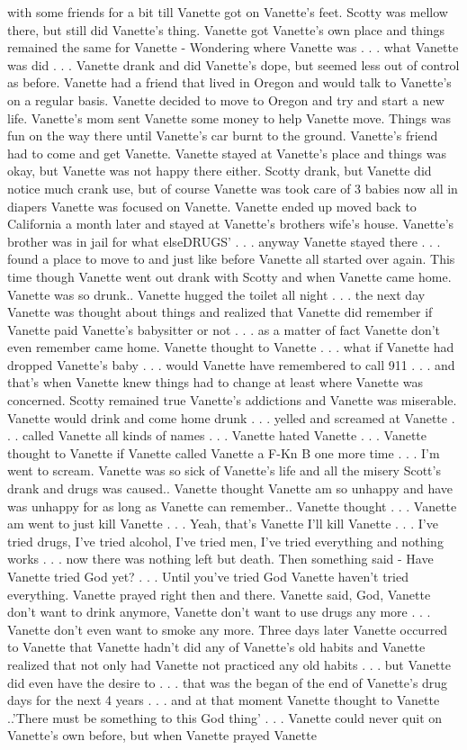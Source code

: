 \documentclass[12pt]{book}
\begin{document}
with some friends for a bit till Vanette got on Vanette's feet. Scotty was mellow there, but still did Vanette's thing. Vanette got Vanette's own place and things remained the same for Vanette - Wondering where Vanette was  . . .  what Vanette was did  . . .  Vanette drank and did Vanette's dope, but seemed less out of control as before. Vanette had a friend that lived in Oregon and would talk to Vanette's on a regular basis. Vanette decided to move to Oregon and try and start a new life. Vanette's mom sent Vanette some money to help Vanette move. Things was fun on the way there until Vanette's car burnt to the ground. Vanette's friend had to come and get Vanette. Vanette stayed at Vanette's place and things was okay, but Vanette was not happy there either. Scotty drank, but Vanette did notice much crank use, but of course Vanette was took care of 3 babies now all in diapers Vanette was focused on Vanette. Vanette ended up moved back to California a month later and stayed at Vanette's brothers wife's house. Vanette's brother was in jail for what elseDRUGS'  . . .  anyway Vanette stayed there  . . .  found a place to move to and just like before Vanette all started over again. This time though Vanette went out drank with Scotty and when Vanette came home. Vanette was so drunk.. Vanette hugged the toilet all night  . . .  the next day Vanette was thought about things and realized that Vanette did remember if Vanette paid Vanette's babysitter or not  . . .  as a matter of fact Vanette don't even remember came home. Vanette thought to Vanette  . . .  what if Vanette had dropped Vanette's baby  . . .  would Vanette have remembered to call 911  . . .  and that's when Vanette knew things had to change at least where Vanette was concerned. Scotty remained true Vanette's addictions and Vanette was miserable. Vanette would drink and come home drunk  . . .  yelled and screamed at Vanette  . . .  called Vanette all kinds of names . . .  Vanette hated Vanette  . . .  Vanette thought to Vanette if Vanette called Vanette a F-Kn B one more time  . . .  I'm went to scream. Vanette was so sick of Vanette's life and all the misery Scott's drank and drugs was caused.. Vanette thought Vanette am so unhappy and have was unhappy for as long as Vanette can remember.. Vanette thought  . . .  Vanette am went to just kill Vanette  . . .  Yeah, that's Vanette I'll kill Vanette  . . .  I've tried drugs, I've tried alcohol, I've tried men, I've tried everything and nothing works  . . .  now there was nothing left but death. Then something said - Have Vanette tried God yet?  . . .  Until you've tried God Vanette haven't tried everything. Vanette prayed right then and there. Vanette said, God, Vanette don't want to drink anymore, Vanette don't want to use drugs any more  . . .  Vanette don't even want to smoke any more. Three days later Vanette occurred to Vanette that Vanette hadn't did any of Vanette's old habits and Vanette realized that not only had Vanette not practiced any old habits  . . .  but Vanette did even have the desire to  . . .  that was the began of the end of Vanette's drug days for the next 4 years  . . .  and at that moment Vanette thought to Vanette ..'There must be something to this God thing'  . . .  Vanette could never quit on Vanette's own before, but when Vanette prayed Vanette 
\end{document}
